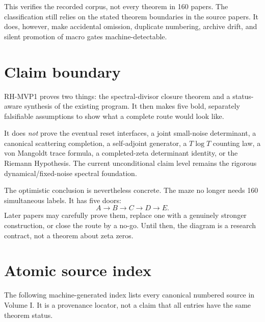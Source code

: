 \documentclass[11pt]{article}
\theoremstyle{definition}
\theoremstyle{remark}
\begin{document}
This verifies the recorded corpus, not every theorem in 160 papers.  The
classification still relies on the stated theorem boundaries in the source
papers.  It does, however, make accidental omission, duplicate numbering,
archive drift, and silent promotion of macro gates machine-detectable.

\section{Claim boundary}

RH-MVP1 proves two things: the spectral-divisor closure theorem and a
status-aware synthesis of the existing program.  It then makes five bold,
separately falsifiable assumptions to show what a complete route would look
like.

It does \emph{not} prove the eventual reset interfaces, a joint small-noise
determinant, a canonical scattering completion, a self-adjoint generator, a
$T\log T$ counting law, a von Mangoldt trace formula, a completed-zeta
determinant identity, or the Riemann Hypothesis.  The current unconditional
claim level remains the rigorous dynamical/fixed-noise spectral foundation.

The optimistic conclusion is nevertheless concrete.  The maze no longer
needs 160 simultaneous labels.  It has five doors:
\[
 \boxed{A\longrightarrow B\longrightarrow C\longrightarrow D\longrightarrow E.}
\]
Later papers may carefully prove them, replace one with a genuinely stronger
construction, or close the route by a no-go.  Until then, the diagram is a
research contract, not a theorem about zeta zeros.

\appendix
\section{Atomic source index}

The following machine-generated index lists every canonical numbered source
in Volume I.  It is a provenance locator, not a claim that all entries have
the same theorem status.





\end{document}
